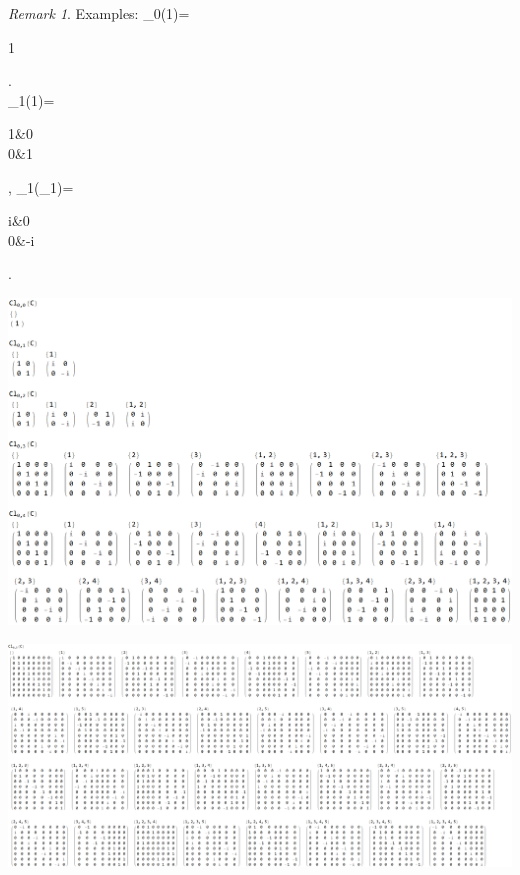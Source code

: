 \documentclass[12pt, letterpaper]{article}
\newcommand{\bfe}{\mathbf{e}}
\newenvironment{eqlong}{\equation\aligned}{\endaligned\endequation}
\theoremstyle{definition}
\theoremstyle{remark}
\newtheorem*{rem*}{Remark}
\theoremstyle{definition}
\theoremstyle{plain}
\numberwithin{equation}{section}
\begin{document}
	\begin{rem*}
		Examples:
		\begin{eqlong}
			\varphi_0(1)=\begin{pmatrix}
				1\\
			\end{pmatrix}.\\
			\varphi_1(1)=\begin{pmatrix}
				1&0\\
				0&1\\
			\end{pmatrix},
			\varphi_1(\bfe_1)=\begin{pmatrix}
				i&0\\
				0&-i\\
			\end{pmatrix}.\\
	\end{eqlong}

	
	\includegraphics[scale=0.4]{CliffordAlgebraMatrixRepresentationAlt0_4}

	\includegraphics[scale=0.25]{CliffordAlgebraMatrixRepresentationAlt5}
		

	\end{rem*}
\end{document}
